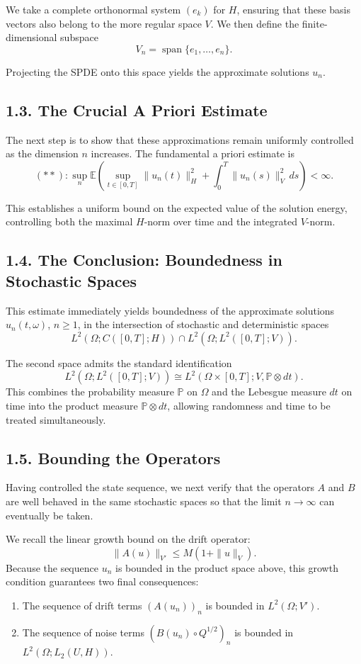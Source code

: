 \documentclass[11pt]{article}
\theoremstyle{definition}
\theoremstyle{remark}
\begin{document}
We take a complete orthonormal system \((e_k)\) for \(H\), ensuring that these basis vectors also belong to the more regular space \(V\). We then define the finite-dimensional subspace
\[
V_n=\operatorname{span}\{e_1,\dots,e_n\}.
\]

Projecting the SPDE onto this space yields the approximate solutions \(u_n\).

\subsection*{1.3. The Crucial A Priori Estimate}
The next step is to show that these approximations remain uniformly controlled as the dimension \(n\) increases. The fundamental a priori estimate is
\[
(\ast\ast)\colon
\sup_n
\mathbb E\left(
\sup_{t\in[0,T]}\|u_n(t)\|_H^2
+
\int_0^T \|u_n(s)\|_V^2\,ds
\right)
<\infty.
\]

This establishes a uniform bound on the expected value of the solution energy, controlling both the maximal \(H\)-norm over time and the integrated \(V\)-norm.

\subsection*{1.4. The Conclusion: Boundedness in Stochastic Spaces}
This estimate immediately yields boundedness of the approximate solutions \(u_n(t,\omega)\), \(n\ge 1\), in the intersection of stochastic and deterministic spaces
\[
L^2(\Omega;C([0,T];H))\cap L^2(\Omega;L^2([0,T];V)).
\]

The second space admits the standard identification
\[
L^2(\Omega;L^2([0,T];V))
\cong
L^2(\Omega\times[0,T];V,\mathbb P\otimes dt).
\]
This combines the probability measure \(\mathbb P\) on \(\Omega\) and the Lebesgue measure \(dt\) on time into the product measure \(\mathbb P\otimes dt\), allowing randomness and time to be treated simultaneously.

\subsection*{1.5. Bounding the Operators}
Having controlled the state sequence, we next verify that the operators \(A\) and \(B\) are well behaved in the same stochastic spaces so that the limit \(n\to\infty\) can eventually be taken.

We recall the linear growth bound on the drift operator:
\[
\|A(u)\|_{V'}\le M(1+\|u\|_V).
\]
Because the sequence \(u_n\) is bounded in the product space above, this growth condition guarantees two final consequences:
\begin{enumerate}
\item The sequence of drift terms \((A(u_n))_n\) is bounded in \(L^2(\Omega;V')\).
\item The sequence of noise terms \((B(u_n)\circ Q^{1/2})_n\) is bounded in \(L^2(\Omega;L_2(U,H))\).
\end{enumerate}
\end{document}
